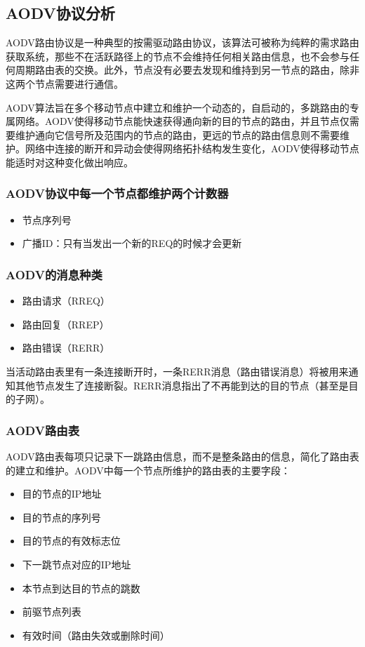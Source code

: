 \documentclass[12pt,a4paper]{article}
\begin{document}
\subsection{AODV协议分析}
AODV路由协议\cite{cs647_aodv}是一种典型的按需驱动路由协议，该算法可被称为纯粹的需求路由获取系统，那些不在活跃路径上的节点不会维持任何相关路由信息，也不会参与任何周期路由表的交换。此外，节点没有必要去发现和维持到另一节点的路由，除非这两个节点需要进行通信。

AODV算法旨在多个移动节点中建立和维护一个动态的，自启动的，多跳路由的专属网络。AODV使得移动节点能快速获得通向新的目的节点的路由，并且节点仅需要维护通向它信号所及范围内的节点的路由，更远的节点的路由信息则不需要维护。网络中连接的断开和异动会使得网络拓扑结构发生变化，AODV使得移动节点能适时对这种变化做出响应。

\subsubsection{AODV协议中每一个节点都维护两个计数器}
\begin{itemize}
	\item 节点序列号
	\item 广播ID：只有当发出一个新的REQ的时候才会更新
\end{itemize}

\subsubsection{AODV的消息种类}
\begin{itemize}
	\item 路由请求（RREQ）
	\item 路由回复（RREP）
	\item 路由错误（RERR）
\end{itemize}
当活动路由表里有一条连接断开时，一条RERR消息（路由错误消息）将被用来通知其他节点发生了连接断裂。RERR消息指出了不再能到达的目的节点（甚至是目的子网）。

\subsubsection{AODV路由表}
AODV路由表每项只记录下一跳路由信息，而不是整条路由的信息，简化了路由表的建立和维护。AODV中每一个节点所维护的路由表的主要字段：
\begin{itemize}
	\item 目的节点的IP地址
	\item 目的节点的序列号
	\item 目的节点的有效标志位
	\item 下一跳节点对应的IP地址
	\item 本节点到达目的节点的跳数
	\item 前驱节点列表
	\item 有效时间（路由失效或删除时间）
\end{itemize}
\end{document}

